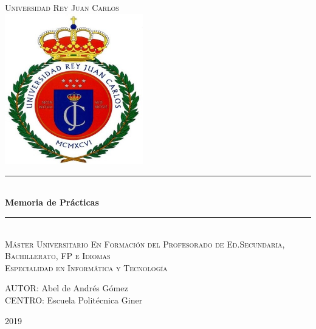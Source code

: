 \documentclass[spanish,12pt, a4paper,twoside]{paper}
\begin{document}
\begin{titlepage}

\newcommand{\HRule}{\rule{\linewidth}{0.5mm}} %

\renewcommand{\baselinestretch}{1.5}

\center %
\vspace*{5pt}
\textsc{\huge Universidad Rey Juan Carlos }
\\[2cm]

\includegraphics[width=6cm]{recursos/escudo_urjc}
\\[2cm]





\HRule \\[0.4cm]
{ \huge \bfseries Memoria de Prácticas}\\[0.4cm] %
\HRule \\[2.5cm]

\textsc{\Large Máster Universitario En Formación del Profesorado de Ed.Secundaria, Bachillerato, FP e Idiomas }\\[0.7cm]
\textsc{ Especialidad en Informática y Tecnología }\\[1cm]

\begin{flushright}
\large
AUTOR: Abel de Andrés Gómez\\
CENTRO: Escuela Politécnica Giner\linebreak
\end{flushright}

\vspace{1cm}

{ {2019}}\\[3cm]

\vfill %

\end{titlepage}
\end{document}

